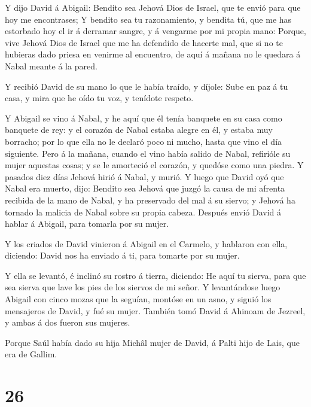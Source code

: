  Y dijo David á Abigail: Bendito sea Jehová Dios de Israel,
que te envió para que hoy me encontrases;  Y bendito sea tu
razonamiento, y bendita tú, que me has estorbado hoy el ir á derramar
sangre, y á vengarme por mi propia mano:  Porque, vive
Jehová Dios de Israel que me ha defendido de hacerte mal, que si no te
hubieras dado priesa en venirme al encuentro, de aquí á mañana no le
quedara á Nabal meante á la pared.

 Y recibió David de su mano lo que le había traído, y
díjole: Sube en paz á tu casa, y mira que he oído tu voz, y tenídote
respeto.

 Y Abigail se vino á Nabal, y he aquí que él tenía banquete
en su casa como banquete de rey: y el corazón de Nabal estaba alegre en
él, y estaba muy borracho; por lo que ella no le declaró poco ni mucho,
hasta que vino el día siguiente.  Pero á la mañana, cuando
el vino había salido de Nabal, refirióle su mujer aquestas cosas; y se
le amorteció el corazón, y quedóse como una piedra.  Y
pasados diez días Jehová hirió á Nabal, y murió.  Y luego
que David oyó que Nabal era muerto, dijo: Bendito sea Jehová que juzgó
la causa de mi afrenta recibida de la mano de Nabal, y ha preservado del
mal á su siervo; y Jehová ha tornado la malicia de Nabal sobre su propia
cabeza. Después envió David á hablar á Abigail, para tomarla por su
mujer.

 Y los criados de David vinieron á Abigail en el Carmelo, y
hablaron con ella, diciendo: David nos ha enviado á ti, para tomarte por
su mujer.

 Y ella se levantó, é inclinó su rostro á tierra, diciendo:
He aquí tu sierva, para que sea sierva que lave los pies de los siervos
de mi señor.  Y levantándose luego Abigail con cinco mozas
que la seguían, montóse en un asno, y siguió los mensajeros de David, y
fué su mujer.  También tomó David á Ahinoam de Jezreel, y
ambas á dos fueron sus mujeres.

 Porque Saúl había dado su hija Michâl mujer de David, á
Palti hijo de Lais, que era de Gallim.

\hypertarget{section-25}{%
\section{26}\label{section-25}}

